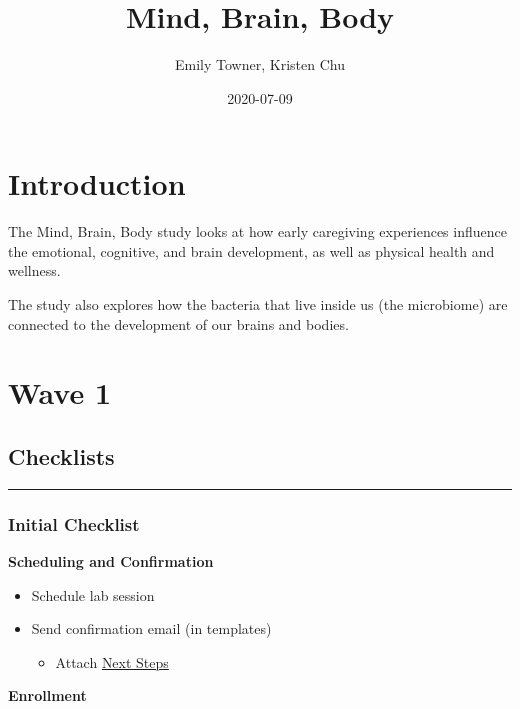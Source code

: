 \documentclass[]{book}
\title{Mind, Brain, Body}
\author{Emily Towner, Kristen Chu}
\date{2020-07-09}
\providecommand{\tightlist}{%
  \setlength{\itemsep}{0pt}\setlength{\parskip}{0pt}}
\begin{document}
\maketitle

{
\setcounter{tocdepth}{1}
\tableofcontents
}
\hypertarget{introduction}{%
\chapter{Introduction}\label{introduction}}

The Mind, Brain, Body study looks at how early caregiving experiences influence the emotional, cognitive, and brain development, as well as physical health and wellness.

The study also explores how the bacteria that live inside us (the microbiome) are connected to the development of our brains and bodies.

\hypertarget{wave-1}{%
\chapter{Wave 1}\label{wave-1}}

\hypertarget{checklists}{%
\section{Checklists}\label{checklists}}

\begin{center}\rule{0.5\linewidth}{0.5pt}\end{center}

\hypertarget{initial-checklist}{%
\subsection{Initial Checklist}\label{initial-checklist}}

\textbf{Scheduling and Confirmation}

\begin{itemize}
\tightlist
\item
  Schedule lab session
\item
  Send confirmation email (in templates)

  \begin{itemize}
  \tightlist
  \item
    Attach \href{https://app.box.com/file/630326369239}{Next Steps}
  \end{itemize}
\end{itemize}

\textbf{Enrollment}
\end{document}
